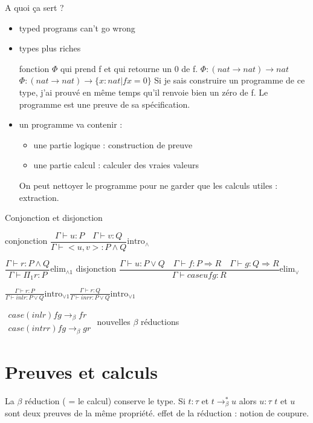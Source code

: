 \documentclass[10pt,a4paper]{article}
\begin{document}
A quoi ça sert ? 
\begin{itemize}
 \item \og typed programs can't go wrong \fg
 \item types plus riches \begin{ex}
                          fonction $\Phi$ qui prend f et qui retourne un 0 de f.
                          $\Phi: (nat → nat ) → nat$
                          $\Phi: (nat → nat ) → \{ x : nat | f x = 0 \}$ Si je sais construire un programme de ce type, j'ai prouvé en même temps qu'il renvoie bien un zéro de f.
                          Le programme est une preuve de sa spécification.
                         \end{ex}
 \item un programme va contenir : \begin{itemize}
                          \item une partie logique : construction de preuve
                          \item une partie calcul : calculer des \og vraies valeurs \fg
                         \end{itemize}
On peut nettoyer le programme pour ne garder que les calculs utiles : extraction.

\end{itemize}


Conjonction et disjonction

conjonction 
$\dfrac{\Gamma \vdash u:P  \quad \Gamma \vdash v:Q }{\Gamma \vdash <u,v> : P \wedge Q}\text{intro}_{\wedge}$

$\dfrac{\Gamma \vdash r : P \wedge Q}{\Gamma \vdash \Pi_1 r :P }\text{elim}_{\wedge 1}$
disjonction
$\dfrac{\Gamma \vdash u : P \vee Q \quad \Gamma \vdash f: P \Rightarrow R \quad \Gamma \vdash g : Q \Rightarrow R}{\Gamma \vdash case u f g : R}\text{elim}_{\vee}$

$\frac{\Gamma \vdash r: P}{\Gamma \vdash inl r : P \vee Q}\text{intro}_{\vee 1}
\frac{\Gamma \vdash r: Q}{\Gamma \vdash inr r : P \vee Q}\text{intro}_{\vee 1}$

$\begin{array}{l}
case (inl r) f g →_{\beta} f r\\
case (intr r) f g  →_{\beta} g r
\end{array}$ nouvelles $\beta$ réductions


\section{Preuves et calculs}
La $\beta$ réduction ( = le calcul) conserve le type.
Si $t : \tau$ et $t →^*_{\beta} u$ alors $u : \tau$
$t$ et $u$ sont deux preuves de la même propriété.
effet de la réduction : notion de coupure.
\end{document}
